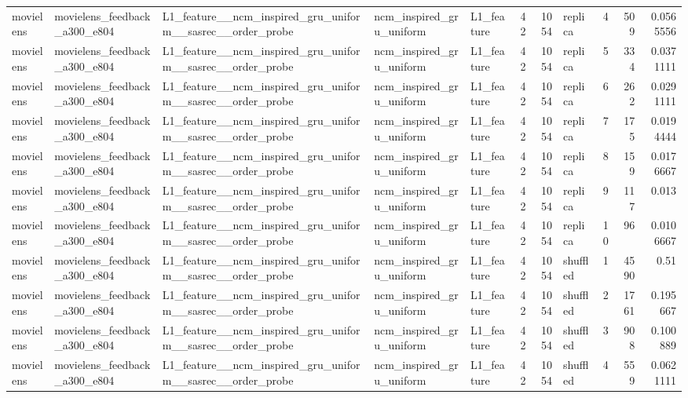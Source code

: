 \begin{table}[htbp!]
\begin{tabular}{lllllrrlrrr}
movielens & movielens\_feedback\_a300\_e804 & L1\_feature\_\_ncm\_inspired\_gru\_uniform\_\_sasrec\_\_order\_probe & ncm\_inspired\_gru\_uniform & L1\_feature & 42 & 1054 & replica & 4 & 509 & 0.0565556 \\
movielens & movielens\_feedback\_a300\_e804 & L1\_feature\_\_ncm\_inspired\_gru\_uniform\_\_sasrec\_\_order\_probe & ncm\_inspired\_gru\_uniform & L1\_feature & 42 & 1054 & replica & 5 & 334 & 0.0371111 \\
movielens & movielens\_feedback\_a300\_e804 & L1\_feature\_\_ncm\_inspired\_gru\_uniform\_\_sasrec\_\_order\_probe & ncm\_inspired\_gru\_uniform & L1\_feature & 42 & 1054 & replica & 6 & 262 & 0.0291111 \\
movielens & movielens\_feedback\_a300\_e804 & L1\_feature\_\_ncm\_inspired\_gru\_uniform\_\_sasrec\_\_order\_probe & ncm\_inspired\_gru\_uniform & L1\_feature & 42 & 1054 & replica & 7 & 175 & 0.0194444 \\
movielens & movielens\_feedback\_a300\_e804 & L1\_feature\_\_ncm\_inspired\_gru\_uniform\_\_sasrec\_\_order\_probe & ncm\_inspired\_gru\_uniform & L1\_feature & 42 & 1054 & replica & 8 & 159 & 0.0176667 \\
movielens & movielens\_feedback\_a300\_e804 & L1\_feature\_\_ncm\_inspired\_gru\_uniform\_\_sasrec\_\_order\_probe & ncm\_inspired\_gru\_uniform & L1\_feature & 42 & 1054 & replica & 9 & 117 & 0.013 \\
movielens & movielens\_feedback\_a300\_e804 & L1\_feature\_\_ncm\_inspired\_gru\_uniform\_\_sasrec\_\_order\_probe & ncm\_inspired\_gru\_uniform & L1\_feature & 42 & 1054 & replica & 10 & 96 & 0.0106667 \\
movielens & movielens\_feedback\_a300\_e804 & L1\_feature\_\_ncm\_inspired\_gru\_uniform\_\_sasrec\_\_order\_probe & ncm\_inspired\_gru\_uniform & L1\_feature & 42 & 1054 & shuffled & 1 & 4590 & 0.51 \\
movielens & movielens\_feedback\_a300\_e804 & L1\_feature\_\_ncm\_inspired\_gru\_uniform\_\_sasrec\_\_order\_probe & ncm\_inspired\_gru\_uniform & L1\_feature & 42 & 1054 & shuffled & 2 & 1761 & 0.195667 \\
movielens & movielens\_feedback\_a300\_e804 & L1\_feature\_\_ncm\_inspired\_gru\_uniform\_\_sasrec\_\_order\_probe & ncm\_inspired\_gru\_uniform & L1\_feature & 42 & 1054 & shuffled & 3 & 908 & 0.100889 \\
movielens & movielens\_feedback\_a300\_e804 & L1\_feature\_\_ncm\_inspired\_gru\_uniform\_\_sasrec\_\_order\_probe & ncm\_inspired\_gru\_uniform & L1\_feature & 42 & 1054 & shuffled & 4 & 559 & 0.0621111 \\

\end{tabular}
\end{table}
